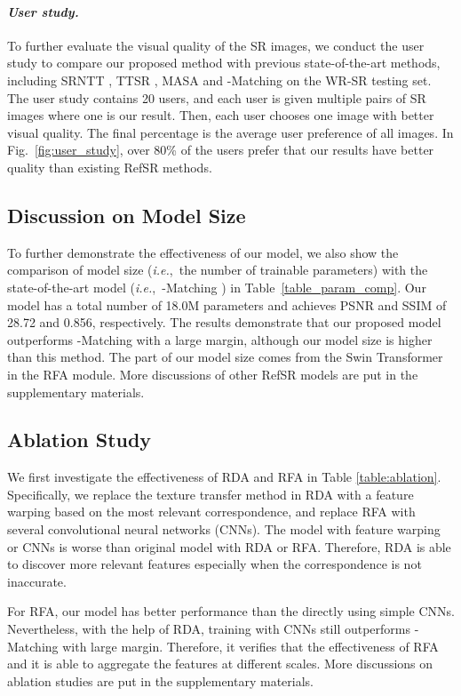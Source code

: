 \documentclass[runningheads]{llncs}
\def\ie{\mbox{\textit{i.e.}, }}
\begin{document}
\paragraph{\textbf{\emph{User study.}}}
To further evaluate the visual quality of the SR images, we conduct the user study to compare our proposed method with previous state-of-the-art methods, including SRNTT \cite{zhang2019image}, TTSR \cite{yang2020learning}, MASA \cite{lu2021masa} and -Matching \cite{jiang2021robust} on the WR-SR testing set.
The user study contains 20 users, and each user is given multiple pairs of SR images where one is our result.
Then, each user chooses one image with better visual quality.
The final percentage is the average user preference of all images.
In Fig.~\ref{fig:user_study}, over 80\% of the users prefer that our results have better quality than existing RefSR methods.


\subsection{Discussion on Model Size}
To further demonstrate the effectiveness of our model, we also show the comparison of model size (\ie the number of trainable parameters) with the state-of-the-art model (\ie -Matching \cite{jiang2021robust}) in Table~\ref{table_param_comp}.
Our model has a total number of 18.0M parameters and achieves PSNR and SSIM of 28.72 and 0.856, respectively.
The results demonstrate that our proposed model outperforms -Matching with a large margin, although our model size is higher than this method.
The part of our model size comes from the Swin Transformer in the RFA module.
More discussions of other RefSR models are put in the supplementary materials.


\subsection{Ablation Study}

We first investigate the effectiveness of RDA and RFA in Table \ref{table:ablation}.
Specifically, we replace the texture transfer method in RDA with a feature warping based on the most relevant correspondence, and replace RFA with several convolutional neural networks (CNNs).
The model with feature warping or CNNs is worse than original model with RDA or RFA.
Therefore, RDA is able to discover more relevant features especially when the correspondence is not inaccurate. 

For RFA, our model has better performance than the directly using simple CNNs.
Nevertheless, with the help of RDA, training with CNNs still outperforms -Matching with large margin. 
Therefore, it verifies that the effectiveness of RFA and it is able to aggregate the features at different scales. 
More discussions on ablation studies are put in the supplementary materials.
\end{document}
